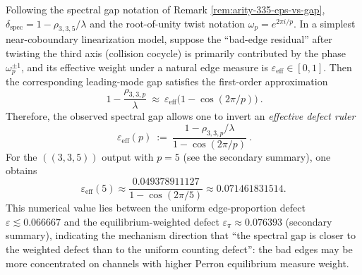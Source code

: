 \begin{corollary}\label{cor:arity-335-eps-eff-inversion}
Following the spectral gap notation of Remark \ref{rem:arity-335-eps-vs-gap},
\(
\delta_{\mathrm{spec}}=1-\rho_{3,3,5}/\lambda
\)
and the root-of-unity twist notation \(\omega_p=e^{2\pi i/p}\).
In a simplest near-coboundary linearization model, suppose the ``bad-edge residual'' after twisting the third axis (collision cocycle) is primarily contributed by the phase \(\omega_p^{\pm1}\), and its effective weight under a natural edge measure is \(\varepsilon_{\mathrm{eff}}\in[0,1]\).
Then the corresponding leading-mode gap satisfies the first-order approximation
$$
\boxed{\
1-\frac{\rho_{3,3,p}}{\lambda}
\ \approx\
\varepsilon_{\mathrm{eff}}\bigl(1-\cos(2\pi/p)\bigr)\ }.
$$
Therefore, the observed spectral gap allows one to invert an \emph{effective defect ruler}
$$
\boxed{\
\varepsilon_{\mathrm{eff}}(p)
\ :=\
\frac{1-\rho_{3,3,p}/\lambda}{1-\cos(2\pi/p)}\ }.
$$
For the \(((3,3,5))\) output with \(p=5\) (see the secondary summary), one obtains
$$
\varepsilon_{\mathrm{eff}}(5)\approx \frac{0.049378911127}{1-\cos(2\pi/5)}
\approx 0.071461831514.
$$
This numerical value lies between the uniform edge-proportion defect \(\varepsilon\lesssim 0.066667\) and the equilibrium-weighted defect \(\varepsilon_\pi\approx 0.076393\) (secondary summary), indicating the mechanism direction that ``the spectral gap is closer to the weighted defect than to the uniform counting defect'': the bad edges may be more concentrated on channels with higher Perron equilibrium measure weight.
\end{corollary}

